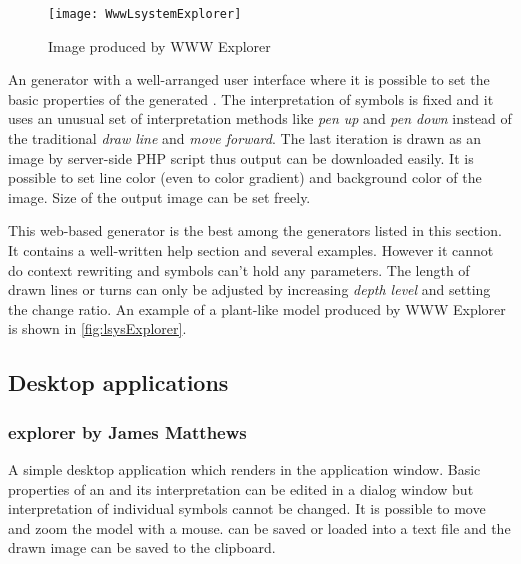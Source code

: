 \begin{wrapfigure}{r}{0.45\textwidth}
	\vspace{-20pt}
	\texttt{[image: WwwLsystemExplorer]}
	\caption{Image produced by WWW \lsystem Explorer}
	\label{fig:lsysExplorer}
\end{wrapfigure}

\noindent
An \lsystem generator with a well-arranged user interface where it is possible to set the basic properties of the generated \lsystems.
The interpretation of symbols is fixed and it uses an unusual set of interpretation methods like \emph{pen up} and \emph{pen down} instead of the traditional \emph{draw line} and \emph{move forward}.
The last iteration is drawn as an image by server-side PHP  script thus output can be downloaded easily.
It is possible to set line color (even to color gradient) and background color of the image.
Size of the output image can be set freely.

This web-based generator is the best among the generators listed in this section.
It contains a well-written help section and several examples.
However it cannot do context rewriting and symbols can't hold any parameters.
The length of drawn lines or turns can only be adjusted by increasing \emph{depth level} and setting the change ratio.
An example of a plant-like model produced by WWW \lsystem Explorer is shown in \autoref{fig:lsysExplorer}.



\subsection{Desktop applications}
\label{sec:DesktopGenerators}

\subsubsection{\lsystems explorer by James Matthews}
\label{sec:LsystemExplorer}

\noindent
A simple desktop application which renders \lsystems in the application window.
Basic properties of an \lsystem and its interpretation can be edited in a dialog window but interpretation of individual symbols cannot be changed.
It is possible to move and zoom the model with a mouse.
\lsystems can be saved or loaded into a text file and the drawn image can be saved to the clipboard.

